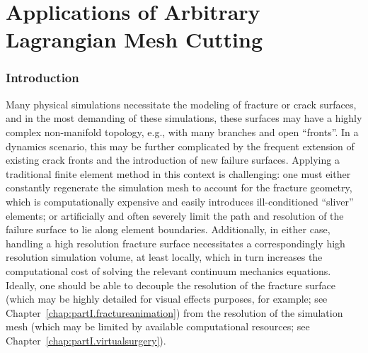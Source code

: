 %

\part{Applications of Arbitrary Lagrangian Mesh Cutting}

\renewcommand{\thechapter}{\thepart}

\section*{Introduction}

Many physical simulations necessitate the modeling of fracture or crack surfaces, and in the most demanding of these simulations, these surfaces may have a highly complex non-manifold topology, e.g., with many branches and open ``fronts''. In a dynamics scenario, this may be further complicated by the frequent extension of existing crack fronts and the introduction of new failure surfaces. Applying a traditional finite element method in this context is challenging: one must either constantly regenerate the simulation mesh to account for the fracture geometry, which is computationally expensive and easily introduces ill-conditioned ``sliver'' elements; or artificially and often severely limit the path and resolution of the failure surface to lie along element boundaries. Additionally, in either case, handling a high resolution fracture surface necessitates a correspondingly high resolution simulation volume, at least locally, which in turn increases the computational cost of solving the relevant continuum mechanics equations. Ideally, one should be able to decouple the resolution of the fracture surface (which may be highly detailed for visual effects purposes, for example; see Chapter~\ref{chap:partI.fractureanimation}) from the resolution of the simulation mesh (which may be limited by available computational resources; see Chapter~\ref{chap:partI.virtualsurgery}).

